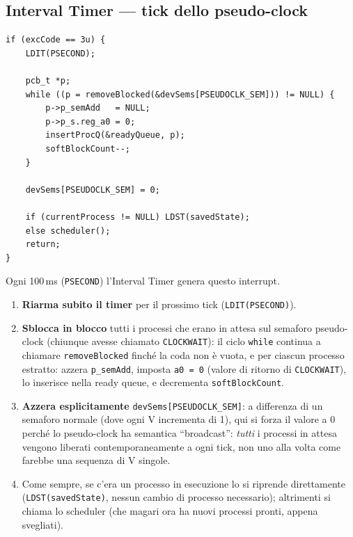 \documentclass[11pt,a4paper]{article}
\newcommand{\code}[1]{\texttt{#1}}
\begin{document}
\subsection{Interval Timer --- tick dello pseudo-clock}
\begin{lstlisting}
if (excCode == 3u) {
    LDIT(PSECOND);

    pcb_t *p;
    while ((p = removeBlocked(&devSems[PSEUDOCLK_SEM])) != NULL) {
        p->p_semAdd   = NULL;
        p->p_s.reg_a0 = 0;
        insertProcQ(&readyQueue, p);
        softBlockCount--;
    }

    devSems[PSEUDOCLK_SEM] = 0;

    if (currentProcess != NULL) LDST(savedState);
    else scheduler();
    return;
}
\end{lstlisting}
Ogni 100\,ms (\code{PSECOND}) l'Interval Timer genera questo interrupt.
\begin{enumerate}
\item \textbf{Riarma subito il timer} per il prossimo tick
  (\code{LDIT(PSECOND)}).
\item \textbf{Sblocca in blocco} tutti i processi che erano in attesa sul
  semaforo pseudo-clock (chiunque avesse chiamato \code{CLOCKWAIT}): il
  ciclo \code{while} continua a chiamare \code{removeBlocked} finché la
  coda non è vuota, e per ciascun processo estratto: azzera
  \code{p\_semAdd}, imposta \code{a0 = 0} (valore di ritorno di
  \code{CLOCKWAIT}), lo inserisce nella ready queue, e decrementa
  \code{softBlockCount}.
\item \textbf{Azzera esplicitamente} \code{devSems[PSEUDOCLK\_SEM]}: a
  differenza di un semaforo normale (dove ogni V incrementa di 1), qui si
  forza il valore a 0 perché lo pseudo-clock ha semantica ``broadcast'':
  \emph{tutti} i processi in attesa vengono liberati contemporaneamente a
  ogni tick, non uno alla volta come farebbe una sequenza di V singole.
\item Come sempre, se c'era un processo in esecuzione lo si riprende
  direttamente (\code{LDST(savedState)}, nessun cambio di processo
  necessario); altrimenti si chiama lo scheduler (che magari ora ha nuovi
  processi pronti, appena svegliati).
\end{enumerate}
\end{document}
